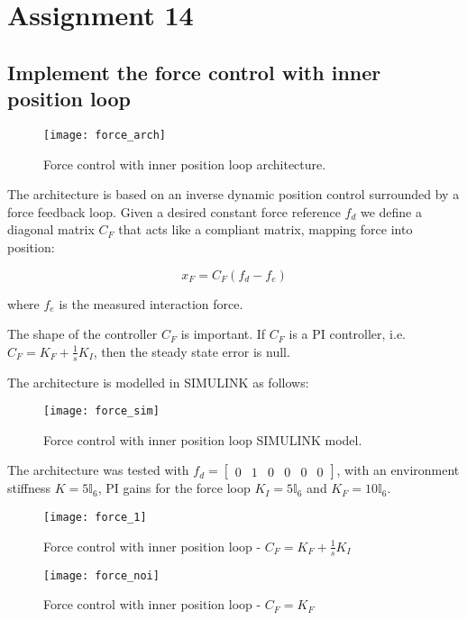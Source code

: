 \section{Assignment 14}

\subsection{Implement the force control with inner position loop}

\begin{figure}[h]
\centering
\texttt{[image: force\_arch]}
\caption{Force control with inner position loop architecture.}
\end{figure}

The architecture is based on an inverse dynamic position control surrounded by a force feedback loop. Given a desired constant force reference $f_d$ we define a diagonal matrix $C_F$ that acts like a compliant matrix, mapping force into position:

\begin{equation*}
x_F = C_F(f_d-f_e)
\end{equation*}

where $f_e$ is the measured interaction force.

The shape of the controller $C_F$ is important. If $C_F$ is a PI controller, i.e. $C_F=K_F+\frac{1}{s}K_I$, then the steady state error is null.

The architecture is modelled in SIMULINK as follows:

\begin{figure}[h]
\centering
\texttt{[image: force\_sim]}
\caption{Force control with inner position loop SIMULINK model.}
\end{figure}

The architecture was tested with $f_d = \begin{bmatrix}
0 & 1 & 0 & 0 & 0 & 0
\end{bmatrix}$, with an environment stiffness $K=5\mathbb I_6$, PI gains for the force loop $K_I=5\mathbb I_6$ and $K_F=10\mathbb I_6$.

\begin{figure}[h]
\centering
\texttt{[image: force\_1]}
\caption{Force control with inner position loop - $C_F=K_F+\frac{1}{s}K_I$}
\end{figure}

\begin{figure}[h]
\centering
\texttt{[image: force\_noi]}
\caption{Force control with inner position loop - $C_F=K_F$}
\end{figure}